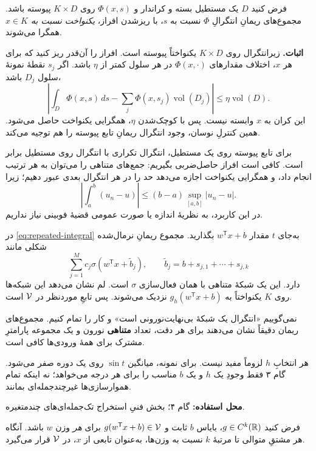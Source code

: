 \clearpage
{}
فرض کنید $D$ یک مستطیل بسته و کراندار و $\Phi(x,s)$ روی $K\times D$ پیوسته باشد. مجموع‌های ریمانِ انتگرالِ $\Phi$ نسبت به $s$، با ریزشدن افراز، \emph{یکنواخت نسبت به $x\in K$} همگرا می‌شوند.

\textbf{اثبات.} زیرانتگرال روی $K\times D$ یکنواختاً پیوسته است. افراز را آن‌قدر ریز کنید که برای هر $x$، اختلاف مقدارهای $\Phi(x,\cdot)$ در هر سلول کمتر از $\eta$ باشد. اگر $s_j$ نقطهٔ نمونهٔ سلول $D_j$ باشد،
\[
\left|\int_D\Phi(x,s)\,ds-
\sum_j\Phi(x,s_j)\operatorname{vol}(D_j)\right|
\leq\eta\operatorname{vol}(D).
\]
این کران به $x$ وابسته نیست. پس با کوچک‌شدن $\eta$، همگرایی یکنواخت حاصل می‌شود. همین کنترلِ نوسان، وجود انتگرال ریمانِ تابع پیوسته را هم توجیه می‌کند.

برای تابع پیوسته روی یک مستطیل، انتگرال تکراری با انتگرال روی مستطیل برابر است. کافی است افراز حاصل‌ضربی بگیریم: جمع‌های متناهی را می‌توان به هر ترتیب انجام داد، و همگرایی یکنواخت اجازه می‌دهد حد را در هر انتگرال بعدی عبور دهیم؛ زیرا
\[
\left|\int_a^b(u_n-u)\right|\leq(b-a)\sup_{[a,b]}|u_n-u|.
\]
در این کاربرد، به نظریهٔ اندازه یا صورت عمومی قضیهٔ فوبینی نیاز نداریم.

در \eqref{eq:repeated-integral} به‌جای $t$ مقدار $w^{\mathsf T}x+b$ بگذارید. مجموع ریمانِ نرمال‌شده شکلی مانند
\[
\sum_{j=1}^{M}c_j\sigma(w^{\mathsf T}x+\widetilde b_j),
\qquad \widetilde b_j=b+s_{j,1}+\cdots+s_{j,k}
\]
دارد. این یک شبکهٔ متناهی با همان فعال‌سازی $\sigma$ است. لم نشان می‌دهد این شبکه‌ها روی $K$ یکنواختاً به $g_h(w^{\mathsf T}x+b)$ نزدیک می‌شوند. پس تابعِ موردنظر در $\mathcal V$ است.

\begin{intuition}
نمی‌گوییم «انتگرال یک شبکهٔ بی‌نهایت‌نورونی است» و کار را تمام کنیم. مجموع‌های ریمان دقیقاً نشان می‌دهند برای هر دقت، تعداد \textbf{متناهی} نورون و یک مجموعه پارامترِ مشترک برای همهٔ ورودی‌ها کافی است.
\end{intuition}

هر انتخابِ $h$ لزوماً مفید نیست. برای نمونه، میانگین $\sin t$ روی یک دوره صفر می‌شود. گام ۳ فقط وجودِ یک $h$ و یک $b$ مناسب را برای هر درجه می‌خواهد؛ نه اینکه تمام هموارسازی‌ها غیرچندجمله‌ای بمانند.

\textbf{محل استفاده:} گام ۴؛ بخش فنیِ استخراج تک‌جمله‌ای‌های چندمتغیره.

فرض کنید $g\in C^k(\mathbb R)$، بایاس $b$ ثابت و $g(w^{\mathsf T}x+b)\in\mathcal V$ برای \emph{هر} وزن $w$ باشد. آنگاه هر مشتقِ متوالی تا مرتبهٔ $k$ نسبت به وزن‌ها، به‌عنوان تابعی از $x$، در $\mathcal V$ قرار می‌گیرد.

